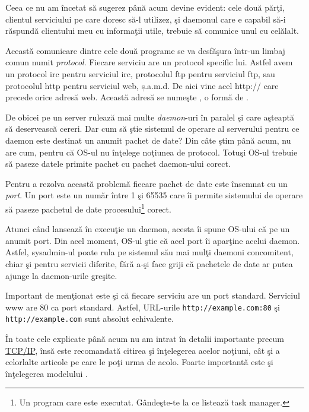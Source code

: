 Ceea ce nu am încetat să sugerez până acum devine evident: cele două părţi, clientul
serviciului pe care doresc să-l utilizez, şi daemonul care e capabil să-i răspundă
clientului meu cu informaţii utile, trebuie să comunice unul cu celălalt.

Această comunicare dintre cele două programe se va desfăşura într-un limbaj comun numit
\textsl{protocol}. Fiecare serviciu are un protocol specific lui. Astfel avem un
protocol irc pentru serviciul irc, protocolul ftp pentru serviciul ftp,
sau protocolul http pentru serviciul web, ș.a.m.d. De aici vine acel {\glqq}http://{\grqq} care precede
orice adresă web. Această adresă se numeşte
,
o formă de .

De obicei pe un server rulează mai multe \textit{daemon}-uri în paralel şi care
aşteaptă să deservească cereri. Dar cum să ştie sistemul de operare al serverului
pentru ce daemon este destinat un anumit pachet de date? Din câte ştim până acum,
nu are cum, pentru că OS-ul nu înţelege noţiunea de {\glqq}protocol{\grqq}. Totuşi OS-ul trebuie
să paseze datele primite pachet cu pachet daemon-ului corect.

Pentru a rezolva această problemă fiecare pachet de date este {\glqq}însemnat{\grqq} cu un \textsl{port}.
Un port este un număr între 1 şi 65535 care îi permite sistemului de operare să
paseze pachetul de date procesului\footnote{Un program care este executat. Gândeşte-te
la ce listează {\glqq}task manager{\grqq}.} corect.

Atunci când  lansează în execuţie un daemon,
acesta îi spune OS-ului că 
pe un anumit port. Din acel moment, OS-ul
{\glqq}ştie{\grqq} că acel port îi {\glqq}aparţine{\grqq} acelui daemon. Astfel, sysadmin-ul poate rula
pe sistemul său mai mulţi daemoni concomitent, chiar şi pentru servicii diferite, fără
a-şi face griji că pachetele de date ar putea ajunge la daemon-urile greşite.

Important de menţionat este şi că fiecare serviciu are un port standard. Serviciul www
are 80 ca port standard. Astfel, URL-urile \texttt{http://example.com:80} şi
\texttt{http://example.com} sunt absolut echivalente.

În toate cele explicate până acum nu am intrat în detalii importante precum
\href{http://en.wikipedia.org/wiki/Internet_Protocol_Suite}{TCP/IP}, însă este recomandată citirea şi
înţelegerea acelor noţiuni, cât şi a celorlalte articole pe care le poţi urma de acolo.
Foarte importantă este şi înţelegerea modelului
.

